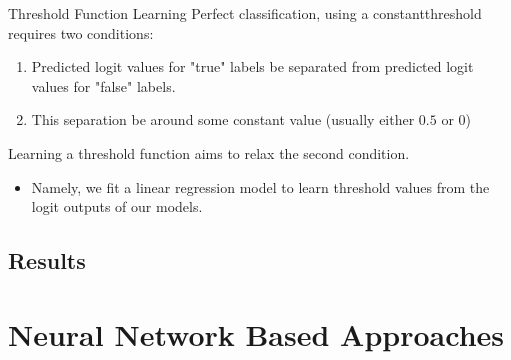 \documentclass{beamer}
\begin{document}
\begin{frame}[t]{Threshold Function Learning}
    Perfect classification, using a constantthreshold requires two conditions:
    \vspace{0.25cm}
    \begin{enumerate}
        \item 
        Predicted logit values for "true" labels be separated from predicted logit values for "false" labels.
        
        \item
        This separation be around some constant value (usually either $0.5$ or $0$)
    \end{enumerate}
    
    \vspace{0.15cm}
    Learning a threshold function aims to relax the second condition.
    
    \begin{itemize}
        \item[\rightarrow] 
        Namely, we fit a linear regression model to learn threshold values from the logit outputs of our models.
    \end{itemize}
\end{frame}

\subsection{Results}

\section{Neural Network Based Approaches}
\end{document}
